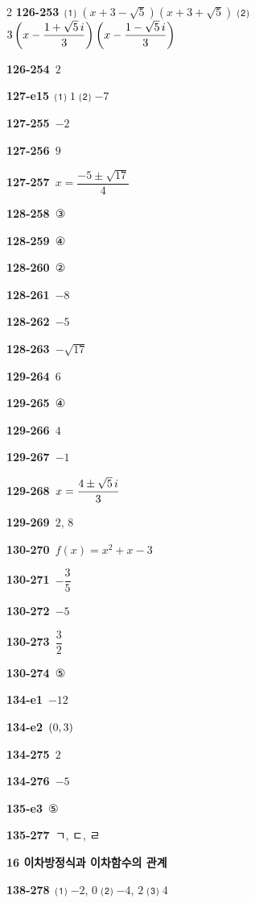 \documentclass[10pt,a4paper]{article}
\begin{document}
\begin{multicols}{2}
\noindent\textbf{126-253}\ ⑴ $(x+3-\sqrt{5})(x+3+\sqrt{5})$ \quad ⑵ $3\left(x-\dfrac{1+\sqrt{5}\mkern3mu i}{3}\right)\left(x-\dfrac{1-\sqrt{5}\mkern3mu i}{3}\right)$\par
\noindent\textbf{126-254}\ $2$\par
\noindent\textbf{127-e15}\ ⑴ $1$ \quad ⑵ $-7$\par
\noindent\textbf{127-255}\ $-2$\par
\noindent\textbf{127-256}\ $9$\par
\noindent\textbf{127-257}\ $x=\dfrac{-5\pm\sqrt{17}}{4}$\par
\noindent\textbf{128-258}\ ③\par
\noindent\textbf{128-259}\ ④\par
\noindent\textbf{128-260}\ ②\par
\noindent\textbf{128-261}\ $-8$\par
\noindent\textbf{128-262}\ $-5$\par
\noindent\textbf{128-263}\ $-\sqrt{17}$\par
\noindent\textbf{129-264}\ $6$\par
\noindent\textbf{129-265}\ ④\par
\noindent\textbf{129-266}\ $4$\par
\noindent\textbf{129-267}\ $-1$\par
\noindent\textbf{129-268}\ $x=\dfrac{4\pm\sqrt{5}\mkern3mu i}{3}$\par
\noindent\textbf{129-269}\ $2$, $8$\par
\noindent\textbf{130-270}\ $f(x)=x^2+x-3$\par
\noindent\textbf{130-271}\ $-\dfrac{3}{5}$\par
\noindent\textbf{130-272}\ $-5$\par
\noindent\textbf{130-273}\ $\dfrac{3}{2}$\par
\noindent\textbf{130-274}\ ⑤\par
\noindent\textbf{134-e1}\ $-12$\par
\noindent\textbf{134-e2}\ $(0{,}\mkern3mu\mathopen{}3)$\par
\noindent\textbf{134-275}\ $2$\par
\noindent\textbf{134-276}\ $-5$\par
\noindent\textbf{135-e3}\ ⑤\par
\noindent\textbf{135-277}\ ㄱ, ㄷ, ㄹ\par
\noindent\textbf{16 이차방정식과 이차함수의 관계}\par\smallskip
\noindent\textbf{138-278}\ ⑴ $-2$, $0$ \quad ⑵ $-4$, $2$ \quad ⑶ $4$\par

\end{multicols}
\end{document}
